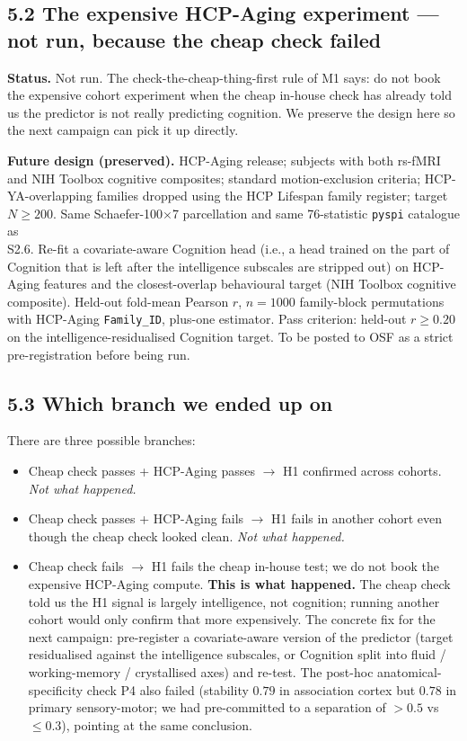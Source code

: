 \documentclass[11pt,letterpaper]{report}
\begin{document}
\subsection*{5.2 The expensive HCP-Aging experiment --- not run, because the cheap check failed}

\textbf{Status.} Not run. The check-the-cheap-thing-first rule of M1 says: do not book the expensive cohort experiment when the cheap in-house check has already told us the predictor is not really predicting cognition. We preserve the design here so the next campaign can pick it up directly.

\textbf{Future design (preserved).} HCP-Aging release; subjects with both rs-fMRI and NIH Toolbox cognitive composites; standard motion-exclusion criteria; HCP-YA-overlapping families dropped using the HCP Lifespan family register; target $N \ge 200$. Same Schaefer-100$\times$7 parcellation and same 76-statistic \texttt{pyspi} catalogue as \\S2.6. Re-fit a covariate-aware Cognition head (i.e., a head trained on the part of Cognition that is left after the intelligence subscales are stripped out) on HCP-Aging features and the closest-overlap behavioural target (NIH Toolbox cognitive composite). Held-out fold-mean Pearson $r$, $n = 1000$ family-block permutations with HCP-Aging \texttt{Family\_ID}, plus-one estimator. Pass criterion: held-out $r \ge 0.20$ on the intelligence-residualised Cognition target. To be posted to OSF as a strict pre-registration before being run.

\subsection*{5.3 Which branch we ended up on}

There are three possible branches:

\begin{itemize}[leftmargin=1.6em,itemsep=0.2em]
\item Cheap check passes + HCP-Aging passes $\rightarrow$ H1 confirmed across cohorts. \emph{Not what happened.}
\item Cheap check passes + HCP-Aging fails $\rightarrow$ H1 fails in another cohort even though the cheap check looked clean. \emph{Not what happened.}
\item Cheap check fails $\rightarrow$ H1 fails the cheap in-house test; we do not book the expensive HCP-Aging compute. \textbf{This is what happened.} The cheap check told us the H1 signal is largely intelligence, not cognition; running another cohort would only confirm that more expensively. The concrete fix for the next campaign: pre-register a covariate-aware version of the predictor (target residualised against the intelligence subscales, or Cognition split into fluid / working-memory / crystallised axes) and re-test. The post-hoc anatomical-specificity check P4 also failed (stability $0.79$ in association cortex but $0.78$ in primary sensory-motor; we had pre-committed to a separation of $> 0.5$ vs $\le 0.3$), pointing at the same conclusion.
\end{itemize}
\end{document}
